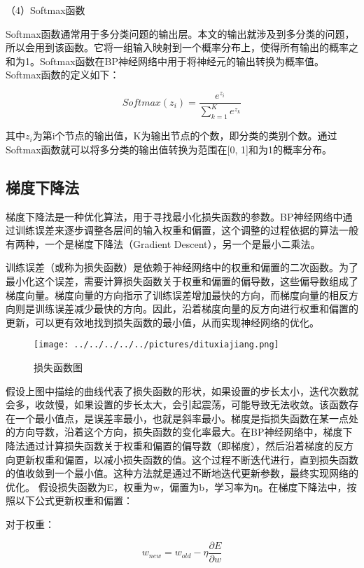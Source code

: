 （4）Softmax函数

Softmax函数通常用于多分类问题的输出层。本文的输出就涉及到多分类的问题，所以会用到该函数。它将一组输入映射到一个概率分布上，使得所有输出的概率之和为1。Softmax函数在BP神经网络中用于将神经元的输出转换为概率值。Softmax函数的定义如下：

\begin{equation}
	Softmax(z_i) = \frac{e^{z_i}}{\sum\limits_{k=1}^{K} e^{z_k}} 
\end{equation}

其中$z_i$为第i个节点的输出值，K为输出节点的个数，即分类的类别个数。通过Softmax函数就可以将多分类的输出值转换为范围在[0, 1]和为1的概率分布。
\subsection{梯度下降法}
梯度下降法是一种优化算法，用于寻找最小化损失函数的参数。BP神经网络中通过训练误差来逐步调整各层间的输入权重和偏置，这个调整的过程依据的算法一般有两种，一个是梯度下降法（Gradient Descent），另一个是最小二乘法。

训练误差（或称为损失函数）是依赖于神经网络中的权重和偏置的二次函数。为了最小化这个误差，需要计算损失函数关于权重和偏置的偏导数，这些偏导数组成了梯度向量。梯度向量的方向指示了训练误差增加最快的方向，而梯度向量的相反方向则是训练误差减少最快的方向。因此，沿着梯度向量的反方向进行权重和偏置的更新，可以更有效地找到损失函数的最小值，从而实现神经网络的优化。

\begin{figure}[!h]
	\centering
	\texttt{[image: ../../../../../pictures/dituxiajiang.png]}
	\caption{损失函数图}
\end{figure}

假设上图中描绘的曲线代表了损失函数的形状，如果设置的步长太小，迭代次数就会多，收敛慢，如果设置的步长太大，会引起震荡，可能导致无法收敛。该函数存在一个最小值点，是误差率最小，也就是斜率最小。梯度是指损失函数在某一点处的方向导数，沿着这个方向，损失函数的变化率最大。在BP神经网络中，梯度下降法通过计算损失函数关于权重和偏置的偏导数（即梯度），然后沿着梯度的反方向更新权重和偏置，以减小损失函数的值。这个过程不断迭代进行，直到损失函数的值收敛到一个最小值。这种方法就是通过不断地迭代更新参数，最终实现网络的优化。
假设损失函数为E，权重为w，偏置为b，学习率为η。在梯度下降法中，按照以下公式更新权重和偏置：

对于权重：

\begin{equation}
w_{new} = w_{old} - \eta \frac{\partial E}{\partial w}
\end{equation}

